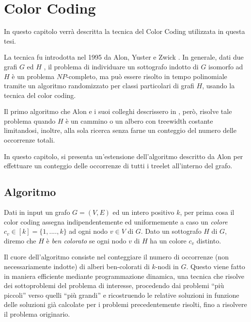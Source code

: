 \chapter{Color Coding}
\label{cap 2}
In questo capitolo verr\`a descritta la tecnica del Color Coding utilizzata in questa tesi.

La tecnica fu introdotta nel 1995 da Alon, Yuster e Zwick \cite{alon1995color}.
In generale, dati due grafi $G$ ed $ H $ , il problema di individuare un sottografo indotto di $ G $ isomorfo ad $ H $ \`e un problema $ NP $-completo, ma pu\`o essere risolto in tempo polinomiale tramite un algoritmo randomizzato per classi particolari di grafi $ H $, usando la tecnica del color coding.

Il primo algoritmo che Alon e i suoi colleghi descrissero in \cite{alon1995color} , per\`o, risolve tale problema quando $ H $ \`e un cammino o un albero con treewidth costante limitandosi, inoltre, alla sola ricerca senza farne un conteggio del numero delle occorrenze totali.
 
In questo capitolo, si presenta un'estensione dell'algoritmo descritto da Alon \cite{alon1995color,bressan2018motif} per effettuare un conteggio delle occorrenze di tutti i treelet all'interno del grafo.\\




\section{Algoritmo}
\label{section1}

Dati in input un grafo $ G=(V,E) $ ed un intero positivo $ k $, per prima cosa il color coding assegna indipendentemente ed uniformemente a caso un \emph{colore}  $c_v \in [k] = \{1,....,k\} $ ad ogni nodo  $ v\in V $ di $ G $.
Dato un sottografo $H$ di $G$, diremo che $H$ è \emph{ben colorato} se ogni nodo $v$ di $H$ ha un colore $c_v$ distinto.

Il cuore dell'algoritmo consiste nel conteggiare il numero di occorrenze (non necessariamente indotte) di alberi ben-colorati di $k$-nodi in $ G $.
Questo viene fatto in maniera efficiente mediante programmazione dinamica, una tecnica che risolve dei sottoproblemi del problema di interesse, procedendo dai problemi ``pi\`u piccoli'' verso quelli ``pi\`u grandi'' e ricostruendo le relative soluzioni in funzione delle soluzioni già calcolate per i problemi precedentemente risolti, fino a risolvere il problema originario.

